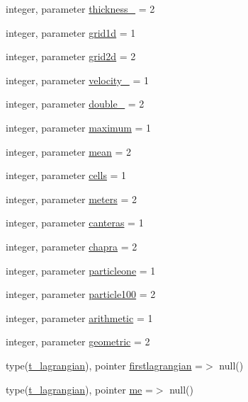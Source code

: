 \begin{DoxyCompactItemize}
\item 
integer, parameter \mbox{\hyperlink{namespacemodulelagrangian_a1af40ddd2e883571577894c77bf10fb3}{thickness\+\_\+}} = 2
\item 
integer, parameter \mbox{\hyperlink{namespacemodulelagrangian_af5c012e49910b7c910e0d88a63d3aa3f}{grid1d}} = 1
\item 
integer, parameter \mbox{\hyperlink{namespacemodulelagrangian_afd89691cefd8da9601761d5d7b6d7281}{grid2d}} = 2
\item 
integer, parameter \mbox{\hyperlink{namespacemodulelagrangian_a2268360ddc2ed048583c950224036ae5}{velocity\+\_\+}} = 1
\item 
integer, parameter \mbox{\hyperlink{namespacemodulelagrangian_a1c1e92f05b0291ba5632514a04da4c82}{double\+\_\+}} = 2
\item 
integer, parameter \mbox{\hyperlink{namespacemodulelagrangian_a9a8f532518f35f76544a72fa64ce818e}{maximum}} = 1
\item 
integer, parameter \mbox{\hyperlink{namespacemodulelagrangian_aa47f2b7ccc24276c600984e1cdc318c2}{mean}} = 2
\item 
integer, parameter \mbox{\hyperlink{namespacemodulelagrangian_a389b9ad184257dfd656ba77750090d62}{cells}} = 1
\item 
integer, parameter \mbox{\hyperlink{namespacemodulelagrangian_ab582d6869d60bcf088caba107dd31c12}{meters}} = 2
\item 
integer, parameter \mbox{\hyperlink{namespacemodulelagrangian_ac20a8320616d1a07662bf98257cbd0a2}{canteras}} = 1
\item 
integer, parameter \mbox{\hyperlink{namespacemodulelagrangian_ae2a5fc3d6ab1ade3f234f4f40989bfab}{chapra}} = 2
\item 
integer, parameter \mbox{\hyperlink{namespacemodulelagrangian_aa279e8989c6581fe1312a3f9cd4fdeac}{particleone}} = 1
\item 
integer, parameter \mbox{\hyperlink{namespacemodulelagrangian_a4209a9cf5465c700edfc376d2588592a}{particle100}} = 2
\item 
integer, parameter \mbox{\hyperlink{namespacemodulelagrangian_ad75e0a9327fd989cf7acd4437fa3137c}{arithmetic}} = 1
\item 
integer, parameter \mbox{\hyperlink{namespacemodulelagrangian_a86208fa362b76783d45667092ee2cea3}{geometric}} = 2
\item 
type(\mbox{\hyperlink{structmodulelagrangian_1_1t__lagrangian}{t\+\_\+lagrangian}}), pointer \mbox{\hyperlink{namespacemodulelagrangian_ac7d5cb68e1a2883f07092692f7910881}{firstlagrangian}} =$>$ null()
\item 
type(\mbox{\hyperlink{structmodulelagrangian_1_1t__lagrangian}{t\+\_\+lagrangian}}), pointer \mbox{\hyperlink{namespacemodulelagrangian_a0d1f6dbfbdcf2bc06e8813a1cbfc6bc9}{me}} =$>$ null()
\end{DoxyCompactItemize}


